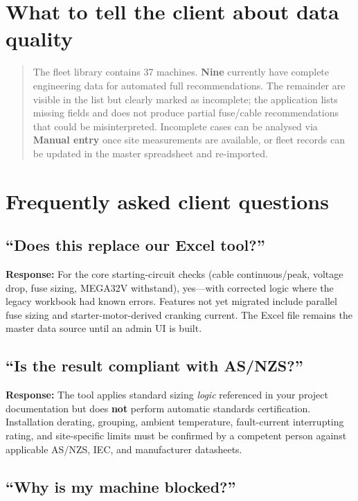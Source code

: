 \documentclass[11pt,a4paper]{report}
\begin{document}
\section{What to tell the client about data quality}

\begin{quote}
\small
The fleet library contains 37 machines. \textbf{Nine} currently have complete engineering data for automated full recommendations. The remainder are visible in the list but clearly marked as incomplete; the application lists missing fields and does not produce partial fuse/cable recommendations that could be misinterpreted. Incomplete cases can be analysed via \textbf{Manual entry} once site measurements are available, or fleet records can be updated in the master spreadsheet and re-imported.
\end{quote}

\section{Frequently asked client questions}

\subsection{``Does this replace our Excel tool?''}

\textbf{Response:} For the core starting-circuit checks (cable continuous/peak, voltage drop, fuse sizing, MEGA32V withstand), yes---with corrected logic where the legacy workbook had known errors. Features not yet migrated include parallel fuse sizing and starter-motor-derived cranking current. The Excel file remains the master data source until an admin UI is built.

\subsection{``Is the result compliant with AS/NZS?''}

\textbf{Response:} The tool applies standard sizing \textit{logic} referenced in your project documentation but does \textbf{not} perform automatic standards certification. Installation derating, grouping, ambient temperature, fault-current interrupting rating, and site-specific limits must be confirmed by a competent person against applicable AS/NZS, IEC, and manufacturer datasheets.

\subsection{``Why is my machine blocked?''}
\end{document}
